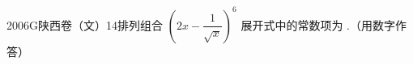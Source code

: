 
\begin{problem}{2006}{G}{陕西卷（文）}{14}{排列组合}
$ \left( 2x - \dfrac{1}{\sqrt{x}} \right)^6 $ 展开式中的常数项为 \underline{\hspace{4em}}.（用数字作答）
\end{problem}

\begin{answer}

\end{answer}

\begin{solutions}

\end{solutions}